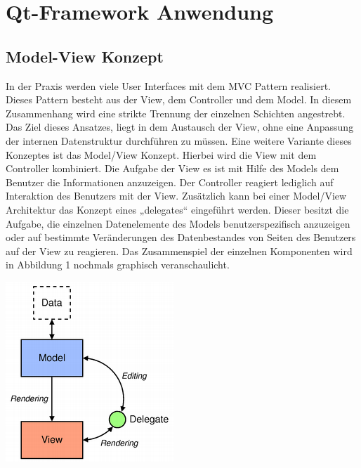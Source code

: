 \newpage
\section{Qt-Framework Anwendung}

\subsection{Model-View Konzept}

In der Praxis werden viele User Interfaces mit dem MVC Pattern realisiert. Dieses Pattern besteht aus der View, dem Controller und dem Model. In diesem Zusammenhang wird eine strikte Trennung der einzelnen Schichten angestrebt. Das Ziel dieses Ansatzes, liegt in dem Austausch der View, ohne eine Anpassung der internen Datenstruktur durchführen zu müssen. Eine weitere Variante dieses Konzeptes ist das Model/View Konzept. Hierbei wird die View mit dem Controller kombiniert. Die Aufgabe der View es ist mit Hilfe des Models dem Benutzer die Informationen anzuzeigen. Der Controller reagiert lediglich auf Interaktion des Benutzers mit der View. Zusätzlich kann bei einer Model/View Architektur das Konzept eines „delegates“ eingeführt werden. Dieser besitzt die Aufgabe, die einzelnen Datenelemente des Models benutzerspezifisch anzuzeigen oder auf bestimmte Veränderungen des Datenbestandes von Seiten des Benutzers auf der View zu reagieren. Das Zusammenspiel der einzelnen Komponenten wird in Abbildung 1 nochmals graphisch veranschaulicht. \\

\begin{center}
\includegraphics[scale=1.0]{images/ModelView.png}  \\
\end{center}

